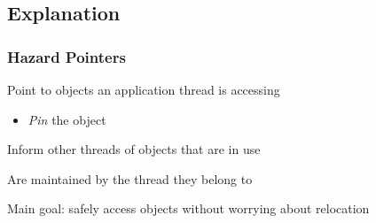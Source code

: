 \documentclass{beamer}
\newcommand{\linespace}{\vskip 0.25cm}
\begin{document}
\subsection*{Explanation}

\begin{frame}

\frametitle{Hazard Pointers}

Point to objects an application thread is accessing
\begin{itemize}
\item \emph{Pin} the object
\end{itemize}

\linespace
\linespace

Inform other threads of objects that are in use

\linespace
\linespace

Are maintained by the thread they belong to

\linespace
\linespace

Main goal: safely access objects without worrying about relocation



\end{frame}
\end{document}
